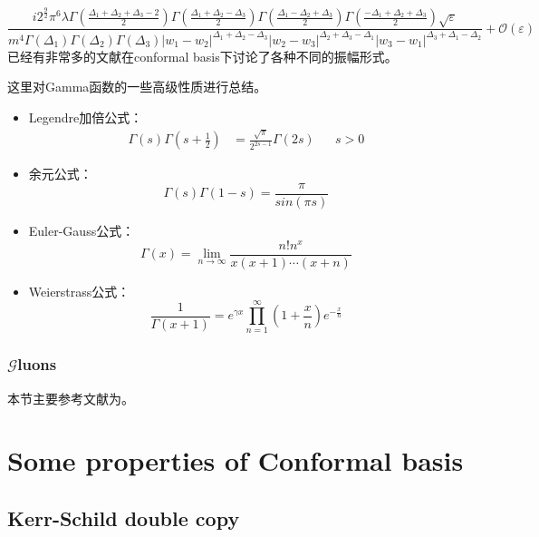 \begin{equation}
	\frac{i2^{\frac{9}{2}}\pi^6\lambda\Gamma(\frac{\Delta_1+\Delta_2+\Delta_3-2}{2})\Gamma(\frac{\Delta_1+\Delta_2-\Delta_3}{2})\Gamma(\frac{\Delta_1-\Delta_2+\Delta_3}{2})\Gamma(\frac{-\Delta_1+\Delta_2+\Delta_3}{2})\sqrt{\varepsilon}}{m^4\Gamma(\Delta_1)\Gamma(\Delta_2)\Gamma(\Delta_3)|w_1-w_2|^{\Delta_1+\Delta_2-\Delta_3}|w_2-w_3|^{\Delta_2+\Delta_3-\Delta_1}|w_3-w_1|^{\Delta_3+\Delta_1-\Delta_2}}+\mathcal{O}(\varepsilon)
\end{equation}
已经有非常多的文献在conformal basis下讨论了各种不同的振幅形式。
\begin{remark}
	这里对Gamma函数的一些高级性质进行总结。
	\begin{itemize}
		\item Legendre加倍公式：
		\begin{equation}
			\begin{aligned}\Gamma(s)\Gamma(s+\frac{1}{2})&=\frac{\sqrt{\pi}}{2^{2s-1}}\Gamma(2s)&&s>0\end{aligned}
		\end{equation}
		\item 余元公式：
		\begin{equation}
			\Gamma(s)\Gamma(1-s)=\frac{\pi}{sin(\pi s)}
		\end{equation}
		\item Euler-Gauss公式：
		\begin{equation}
			\Gamma(x)=\lim_{n\to\infty}\frac{n!n^x}{x(x+1)\cdots(x+n)}
		\end{equation}
		\item Weierstrass公式：
		\begin{equation}
			\frac1{\Gamma(x+1)}=e^{\gamma x}\prod_{n=1}^{\infty}\left(1+\frac xn\right)e^{-\frac xn}
		\end{equation}
	\end{itemize}
\end{remark}
\subsubsection{$\mathcal{G}$luons}
本节主要参考文献为\cite{Pasterski:2017ylz}。
\section{Some properties of Conformal basis}
\subsection{Kerr-Schild double copy}
